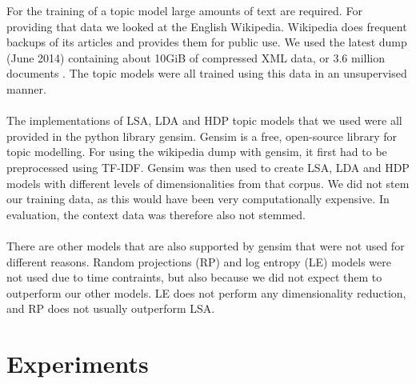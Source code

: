 For the training of a topic model large amounts of text are required. For providing that data we looked at the English Wikipedia. Wikipedia does frequent backups of its articles and provides them for public use. We used the latest dump (June 2014) containing about 10GiB of compressed XML data, or 3.6 million documents \cite{wikidumps}. The topic models were all trained using this data in an unsupervised manner.\\\\
The implementations of LSA, LDA and HDP topic models that we used were all provided in the python library gensim. Gensim is a free, open-source library for topic modelling. For using the wikipedia dump with gensim, it first had to be preprocessed using TF-IDF. Gensim was then used to create LSA, LDA and HDP models with different levels of dimensionalities from that corpus. We did not stem our training data, as this would have been very computationally expensive. In evaluation, the context data was therefore also not stemmed.\\\\
There are other models that are also supported by gensim that were not used for different reasons. Random projections (RP) \cite{RandomProjections, gensimRP} and log entropy (LE) \cite{LogEntropy, gensimLE} models were not used due to time contraints, but also because we did not expect them to outperform our other models. LE does not perform any dimensionality reduction, and RP does not usually outperform LSA. 


\thispagestyle{plain}


\section{Experiments}
